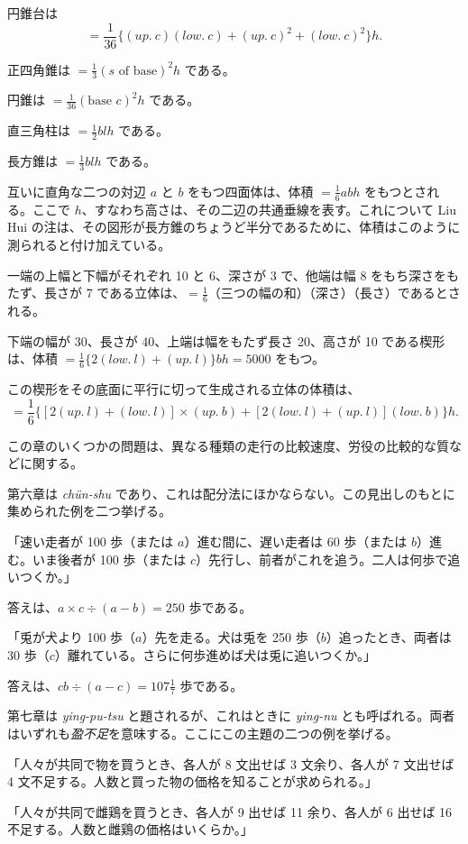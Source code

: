 \documentclass[11pt]{article}
\newcommand{\scanpage}[2]{\clearpage\setcounter{footnote}{0}\noindent{\footnotesize\color{gray}PDF #1 頁 · #2}\par\medskip}
\newcommand{\scanfooter}{}
\begin{document}
円錐台は
\[
=\frac1{36}\{(up.\ c)(low.\ c)+(up.\ c)^2+(low.\ c)^2\}h.
\]

正四角錐は $=\frac13(s\text{ of base})^2h$ である。

円錐は $=\frac1{36}(\text{base }c)^2h$ である。

直三角柱は $=\frac12 blh$ である。

長方錐は $=\frac13 blh$ である。

互いに直角な二つの対辺 $a$ と $b$ をもつ四面体は、体積 $=\frac16abh$ をもつとされる。ここで $h$、すなわち高さは、その二辺の共通垂線を表す。これについて Liu Hui の注は、その図形が長方錐のちょうど半分であるために、体積はこのように測られると付け加えている。

一端の上幅と下幅がそれぞれ 10 と 6、深さが 3 で、他端は幅 8 をもち深さをもたず、長さが 7 である立体は、$=\frac16$（三つの幅の和）（深さ）（長さ）であるとされる。

下端の幅が 30、長さが 40、上端は幅をもたず長さ 20、高さが 10 である楔形は、体積 $=\frac16\{2(low.\ l)+(up.\ l)\}bh=5000$ をもつ。

この楔形をその底面に平行に切って生成される立体の体積は、
\[
=\frac16\{[2(up.\ l)+(low.\ l)]\times(up.\ b)+[2(low.\ l)+(up.\ l)](low.\ b)\}h.
\]
\scanfooter

\scanpage{0030}{第三章、印刷頁16}
この章のいくつかの問題は、異なる種類の走行の比較速度、労役の比較的な質などに関する。

第六章は \emph{chün-shu} であり、これは配分法にほかならない。この見出しのもとに集められた例を二つ挙げる。

「速い走者が 100 歩（または $a$）進む間に、遅い走者は 60 歩（または $b$）進む。いま後者が 100 歩（または $c$）先行し、前者がこれを追う。二人は何歩で追いつくか。」

答えは、$a\times c\div(a-b)=250$ 歩である。

「兎が犬より 100 歩（$a$）先を走る。犬は兎を 250 歩（$b$）追ったとき、両者は 30 歩（$c$）離れている。さらに何歩進めば犬は兎に追いつくか。」

答えは、$cb\div(a-c)=107\frac17$ 歩である。

第七章は \emph{ying-pu-tsu} と題されるが、これはときに \emph{ying-nu} とも呼ばれる。両者はいずれも\emph{盈不足}を意味する。ここにこの主題の二つの例を挙げる。

「人々が共同で物を買うとき、各人が 8 文出せば 3 文余り、各人が 7 文出せば 4 文不足する。人数と買った物の価格を知ることが求められる。」

「人々が共同で雌鶏を買うとき、各人が 9 出せば 11 余り、各人が 6 出せば 16 不足する。人数と雌鶏の価格はいくらか。」
\end{document}
